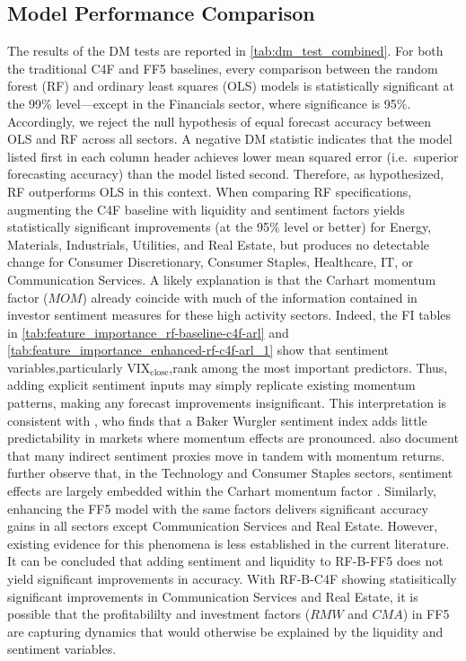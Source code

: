 \subsection{Model Performance Comparison}
The results of the DM tests are reported in \cref{tab:dm_test_combined}.  For both the traditional C4F and FF5 baselines, every comparison between the random forest (RF) and ordinary least squares (OLS) models is statistically significant at the 99\% level—except in the Financials sector, where significance is 95\%.  Accordingly, we reject the null hypothesis of equal forecast accuracy between OLS and RF across all sectors.  A negative DM statistic indicates that the model listed first in each column header achieves lower mean squared error (i.e.\ superior forecasting accuracy) than the model listed second. Therefore, as hypothesized, RF outperforms OLS in this context. When comparing RF specifications, augmenting the C4F baseline with liquidity and sentiment factors yields statistically significant improvements (at the 95\% level or better) for Energy, Materials, Industrials, Utilities, and Real Estate, but produces no detectable change for Consumer Discretionary, Consumer Staples, Healthcare, IT, or Communication Services. A likely explanation is that the Carhart momentum factor ($MOM$) already coincide with much of the information contained in investor sentiment measures for these high activity sectors. Indeed, the FI tables in \cref{tab:feature_importance_rf-baseline-c4f-arl} and \cref{tab:feature_importance_enhanced-rf-c4f-arl_1} show that sentiment variables,particularly $\mathrm{VIX}_{\text{close}}$,rank among the most important predictors.  Thus, adding explicit sentiment inputs may simply replicate existing momentum patterns, making any forecast improvements insignificant.  This interpretation is consistent with , who finds that a Baker Wurgler sentiment index adds little predictability in markets where momentum effects are pronounced.  also document that many indirect sentiment proxies move in tandem with momentum returns.  further observe that, in the Technology and Consumer Staples sectors, sentiment effects are largely embedded within the Carhart momentum factor . Similarly, enhancing the FF5 model with the same factors delivers significant accuracy gains in all sectors except Communication Services and Real Estate. However, existing evidence for this phenomena is less established in the current literature. It can be concluded that adding sentiment and liquidity to RF-B-FF5 does not yield significant improvements in accuracy. With RF-B-C4F showing statisitically significant improvements in Communication Services and Real Estate, it is possible that the profitabililty and investment factors ($RMW$ and $CMA$) in FF5 are capturing dynamics that would otherwise be explained by the liquidity and sentiment variables. 

